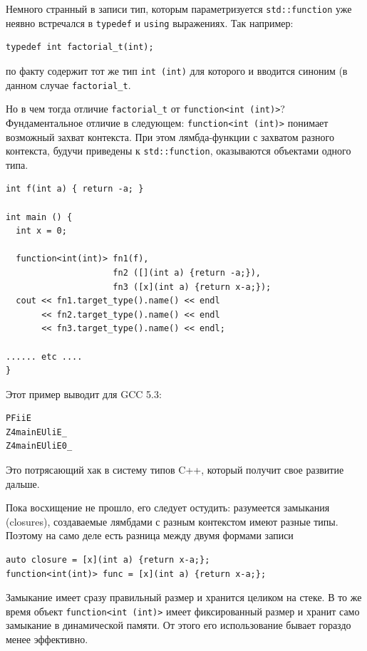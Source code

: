 \documentclass[a4paper,12pt,oneside]{book}
\begin{document}
Немного странный в записи тип, которым параметризуется \lstinline!std::function! уже неявно встречался в \lstinline!typedef! и \lstinline!using! выражениях. Так например:

\begin{lstlisting}
typedef int factorial_t(int);
\end{lstlisting}

по факту содержит тот же тип \lstinline!int (int)! для которого и вводится синоним (в данном случае \lstinline!factorial_t!.

Но в чем тогда отличие \lstinline!factorial_t! от \lstinline!function<int (int)>!? Фундаментальное отличие в следующем: \lstinline!function<int (int)>! понимает возможный захват контекста. При этом лямбда-функции с захватом разного контекста, будучи приведены к \lstinline!std::function!, оказываются объектами одного типа.

\begin{lstlisting}
int f(int a) { return -a; }

int main () {
  int x = 0;

  function<int(int)> fn1(f),
                     fn2 ([](int a) {return -a;}),
                     fn3 ([x](int a) {return x-a;});
  cout << fn1.target_type().name() << endl
       << fn2.target_type().name() << endl
       << fn3.target_type().name() << endl;

...... etc ....
}
\end{lstlisting}

Этот пример выводит для GCC 5.3: 

\begin{verbatim}
PFiiE
Z4mainEUliE_
Z4mainEUliE0_
\end{verbatim}

Это потрясающий хак в систему типов C++, который получит свое развитие дальше.

Пока восхищение не прошло, его следует остудить: разумеется замыкания (closures), создаваемые лямбдами с разным контекстом имеют разные типы. Поэтому на само деле есть разница между двумя формами записи

\begin{lstlisting}
auto closure = [x](int a) {return x-a;};
function<int(int)> func = [x](int a) {return x-a;};
\end{lstlisting}

Замыкание имеет сразу правильный размер и хранится целиком на стеке. В то же время объект \lstinline!function<int (int)>! имеет фиксированный размер и хранит само замыкание в динамической памяти. От этого его использование бывает гораздо менее эффективно.
\end{document}
